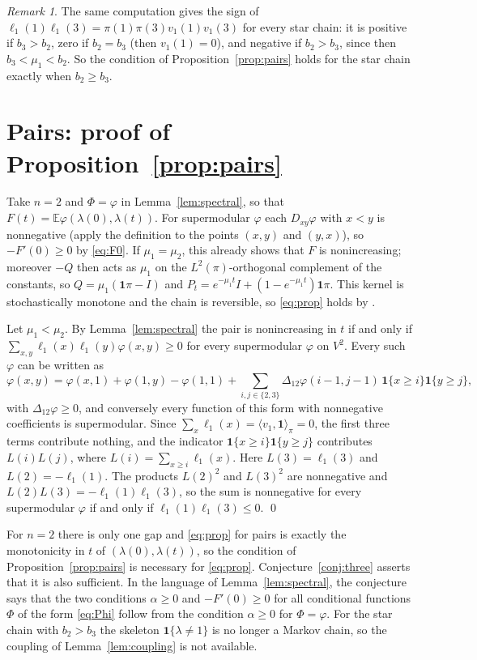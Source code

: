 \documentclass[11pt]{amsart}
\theoremstyle{remark}
\newtheorem{remark}[theorem]{Remark}
\numberwithin{equation}{section}
\newcommand{\E}{\mathbb E}
\newcommand{\1}{\mathbf 1}
\begin{document}
\begin{remark}\label{rem:starsign}
The same computation gives the sign of $\ell_1(1)\ell_1(3)=\pi(1)\pi(3)v_1(1)v_1(3)$ for every star chain: it is positive if $b_3>b_2$, zero if $b_2=b_3$ (then $v_1(1)=0$), and negative if $b_2>b_3$, since then $b_3<\mu_1<b_2$. So the condition of Proposition~\ref{prop:pairs} holds for the star chain exactly when $b_2\ge b_3$.
\end{remark}

\section{Pairs: proof of Proposition~\ref{prop:pairs}}\label{sec:pairs}

Take $n=2$ and $\Phi=\varphi$ in Lemma~\ref{lem:spectral}, so that $F(t)=\E\varphi(\lambda(0),\lambda(t))$. For supermodular $\varphi$ each $D_{xy}\varphi$ with $x<y$ is nonnegative (apply the definition to the points $(x,y)$ and $(y,x)$), so $-F'(0)\ge0$ by \eqref{eq:F0}. If $\mu_1=\mu_2$, this already shows that $F$ is nonincreasing; moreover $-Q$ then acts as $\mu_1$ on the $L^2(\pi)$-orthogonal complement of the constants, so $Q=\mu_1(\1\pi-I)$ and $P_t=e^{-\mu_1t}I+(1-e^{-\mu_1t})\1\pi$. This kernel is stochastically monotone and the chain is reversible, so \eqref{eq:prop} holds by \cite{BR}.

Let $\mu_1<\mu_2$. By Lemma~\ref{lem:spectral} the pair is nonincreasing in $t$ if and only if $\sum_{x,y}\ell_1(x)\ell_1(y)\varphi(x,y)\ge0$ for every supermodular $\varphi$ on $V^2$. Every such $\varphi$ can be written as
\[
\varphi(x,y)=\varphi(x,1)+\varphi(1,y)-\varphi(1,1)+\sum_{i,j\in\{2,3\}}\Delta_{12}\varphi(i-1,j-1)\,\1\{x\ge i\}\1\{y\ge j\},
\]
with $\Delta_{12}\varphi\ge0$, and conversely every function of this form with nonnegative coefficients is supermodular. Since $\sum_x\ell_1(x)=\langle v_1,\1\rangle_\pi=0$, the first three terms contribute nothing, and the indicator $\1\{x\ge i\}\1\{y\ge j\}$ contributes $L(i)L(j)$, where $L(i)=\sum_{x\ge i}\ell_1(x)$. Here $L(3)=\ell_1(3)$ and $L(2)=-\ell_1(1)$. The products $L(2)^2$ and $L(3)^2$ are nonnegative and $L(2)L(3)=-\ell_1(1)\ell_1(3)$, so the sum is nonnegative for every supermodular $\varphi$ if and only if $\ell_1(1)\ell_1(3)\le0$. \qed

For $n=2$ there is only one gap and \eqref{eq:prop} for pairs is exactly the monotonicity in $t$ of $(\lambda(0),\lambda(t))$, so the condition of Proposition~\ref{prop:pairs} is necessary for \eqref{eq:prop}. Conjecture~\ref{conj:three} asserts that it is also sufficient. In the language of Lemma~\ref{lem:spectral}, the conjecture says that the two conditions $\alpha\ge0$ and $-F'(0)\ge0$ for all conditional functions $\Phi$ of the form \eqref{eq:Phi} follow from the condition $\alpha\ge0$ for $\Phi=\varphi$. For the star chain with $b_2>b_3$ the skeleton $\1\{\lambda\ne1\}$ is no longer a Markov chain, so the coupling of Lemma~\ref{lem:coupling} is not available.
\end{document}
